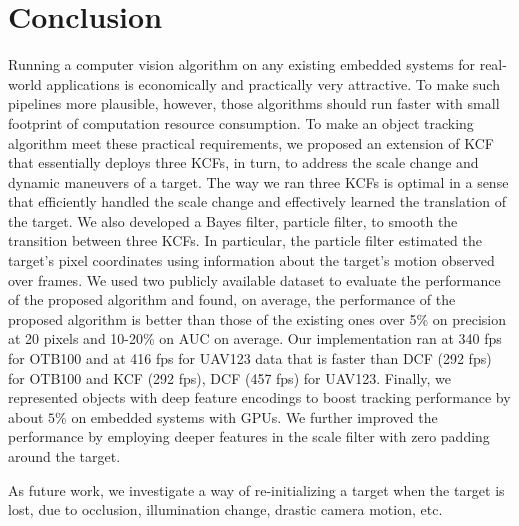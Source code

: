 \documentclass[10pt,twocolumn,letterpaper]{article}
\begin{document}
\section{Conclusion} \label{sc:Conclusion}
Running a computer vision algorithm on any existing embedded systems
for real-world applications is economically and practically very
attractive. To make such pipelines more plausible, however, those
algorithms should run faster with small footprint of computation
resource consumption. To make an object tracking algorithm meet these
practical requirements, we proposed an extension of KCF that
essentially deploys three KCFs, in turn, to address the scale change
and dynamic maneuvers of a target. The way we ran three KCFs is
optimal in a sense that efficiently handled the scale change and
effectively learned the translation of the target. We also developed a
Bayes filter, particle filter, to smooth the transition between three
KCFs. In particular, the particle filter estimated the target's pixel
coordinates using information about the target's motion observed over
frames. We used two publicly available dataset to evaluate the
performance of the proposed algorithm and found, on average, the
performance of the proposed algorithm is better than those of the
existing ones over 5\% on precision at 20 pixels and 10-20\% on AUC on
average. Our implementation ran at 340 fps for OTB100 and at 416 fps
for UAV123 data that is faster than DCF (292 fps) for OTB100 and KCF
(292 fps), DCF (457 fps) for UAV123. Finally, we represented objects
with deep feature encodings to boost tracking performance by about
$5\%$ on embedded systems with GPUs.  We further improved the
performance by employing deeper features in the scale filter with zero
padding around the target.

As future work, we investigate a way of re-initializing a target when
the target is lost, due to occlusion, illumination change, drastic
camera motion, etc.

{\small


}
\end{document}
